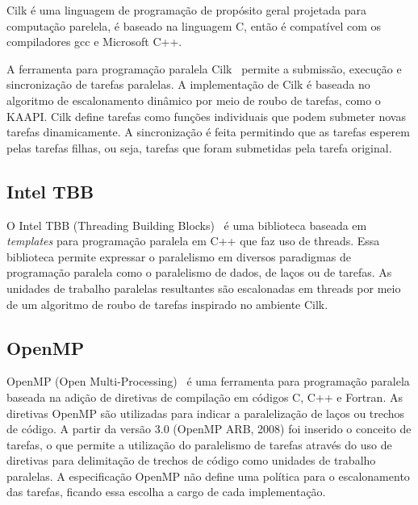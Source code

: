 Cilk é uma linguagem de programação de propósito geral projetada para computação parelela, é baseado na linguagem C, então é compatível com os compiladores gcc e Microsoft C++.

A ferramenta para programação paralela Cilk~\citep{Blumofe:1995:CEM:209936.209958, Blumofe:1997:ARP:1268680.1268690} permite a submissão, execução e sincronização de tarefas paralelas. A implementação de Cilk é baseada no algoritmo de escalonamento dinâmico por meio de roubo de tarefas, como o KAAPI. Cilk define tarefas como funções individuais que podem submeter novas tarefas dinamicamente. A sincronização é feita permitindo que as tarefas esperem pelas tarefas filhas, ou seja, tarefas que foram submetidas pela tarefa original.


\subsection{Intel TBB}

O Intel TBB (Threading Building Blocks)~\citep{Kim:2011:MDP:1920042.1920078} é uma biblioteca baseada em \emph{templates} para programação paralela em C++ que faz uso de threads. Essa biblioteca permite expressar o paralelismo em diversos paradigmas de programação paralela como o paralelismo de dados, de laços ou de tarefas. As unidades de trabalho paralelas resultantes são escalonadas em threads por meio de um algoritmo de roubo de tarefas inspirado no ambiente Cilk.

\subsection{OpenMP}

OpenMP (Open Multi-Processing)~\citep{Quinn:2003:PPC:1211440} é uma ferramenta para programação paralela baseada na adição de diretivas de compilação em códigos C, C++ e Fortran. As diretivas OpenMP são utilizadas para indicar a paralelização de laços ou trechos de código. A partir da versão 3.0 (OpenMP ARB, 2008) foi inserido o conceito de tarefas, o que permite a utilização do paralelismo de tarefas através do uso de diretivas para delimitação de trechos de código como unidades de trabalho paralelas. A especificação OpenMP não define uma política para o escalonamento das tarefas, ficando essa escolha a cargo de cada implementação.








